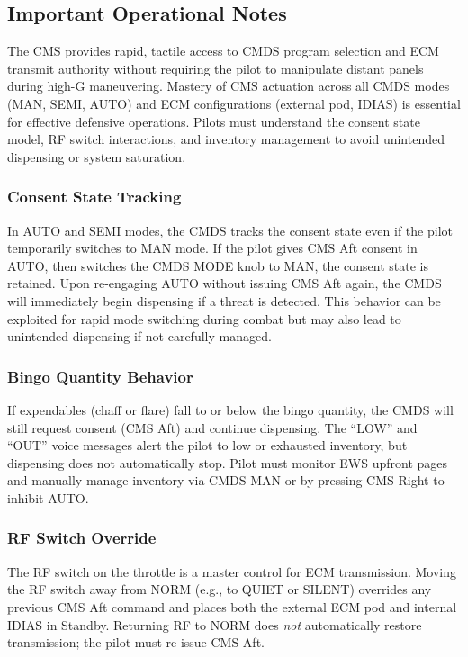 \documentclass[11pt,a4paper]{article}
\begin{document}
\subsection{Important Operational Notes}
\label{sec:C5-S2-S4-cms-notes}

The CMS provides rapid, tactile access to CMDS program selection and ECM transmit authority without requiring the pilot to manipulate distant panels during high-G maneuvering. Mastery of CMS actuation across all CMDS modes (MAN, SEMI, AUTO) and ECM configurations (external pod, IDIAS) is essential for effective defensive operations. Pilots must understand the consent state model, RF switch interactions, and inventory management to avoid unintended dispensing or system saturation.

\subsubsection*{Consent State Tracking}

In AUTO and SEMI modes, the CMDS tracks the consent state even if the pilot temporarily switches to MAN mode. If the pilot gives CMS Aft consent in AUTO, then switches the CMDS MODE knob to MAN, the consent state is retained. Upon re-engaging AUTO without issuing CMS Aft again, the CMDS will immediately begin dispensing if a threat is detected. This behavior can be exploited for rapid mode switching during combat but may also lead to unintended dispensing if not carefully managed.

\subsubsection*{Bingo Quantity Behavior}

If expendables (chaff or flare) fall to or below the bingo quantity, the CMDS will still request consent (CMS Aft) and continue dispensing. The ``LOW'' and ``OUT'' voice messages alert the pilot to low or exhausted inventory, but dispensing does not automatically stop. Pilot must monitor EWS upfront pages and manually manage inventory via CMDS MAN or by pressing CMS Right to inhibit AUTO.

\subsubsection*{RF Switch Override}

The RF switch on the throttle is a master control for ECM transmission. Moving the RF switch away from NORM (e.g., to QUIET or SILENT) overrides any previous CMS Aft command and places both the external ECM pod and internal IDIAS in Standby. Returning RF to NORM does \textit{not} automatically restore transmission; the pilot must re-issue CMS Aft.
\end{document}
